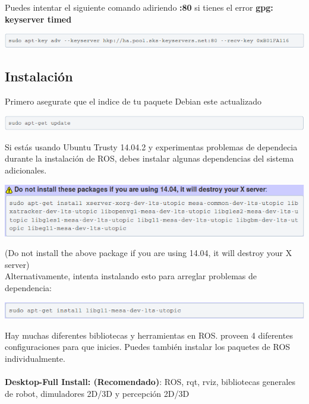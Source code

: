 \documentclass[a4paper,usenames,dvipsnames,svgnames,table]{book}
\begin{document}
Puedes intentar el siguiente comando adiriendo \textbf{:80} si tienes el error \textbf{gpg: keyserver timed}

\begin{center}
\includegraphics[width=1\textwidth]{Figures/Software/Install_ROS/Paso_3.png}
\end{center}

\subsection{Instalación}
Primero asegurate que el indice de tu paquete Debian este actualizado

\begin{center}
\includegraphics[width=1\textwidth]{Figures/Software/Install_ROS/Paso_4.png}
\end{center}

Si estás usando Ubuntu Trusty 14.04.2 y experimentas problemas de dependecia durante la instalación de ROS, debes 
instalar algunas dependencias del sistema adicionales.

\begin{center}
\includegraphics[width=1\textwidth]{Figures/Software/Install_ROS/Paso_5.png}
\end{center}

(Do not install the above package if you are using 14.04, it will destroy your X server)\\
Alternativamente, intenta instalando esto para arreglar problemas de\\ dependencia: 

\begin{center}
\includegraphics[width=1\textwidth]{Figures/Software/Install_ROS/Paso_6.png}
\end{center}

Hay muchas diferentes bibliotecas y herramientas en ROS. proveen 4 diferentes configuraciones para que inicies. Puedes 
también instalar los paquetes de ROS individualmente.\\
\\
\textbf{Desktop-Full Install: (Recomendado)}: ROS, rqt, rviz, bibliotecas generales de robot, dimuladores 2D/3D y 
percepción 2D/3D\\
\\
\end{document}
